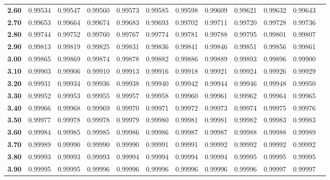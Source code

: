 \documentclass[a4paper]{article}
\begin{document}
\begin{tabular}{l|lllllllllll}
\bfseries  2.60&   0.99534&   0.99547&   0.99560&   0.99573&   0.99585&   0.99598&   0.99609&   0.99621&   0.99632&   0.99643&\\ 
\bfseries  2.70&   0.99653&   0.99664&   0.99674&   0.99683&   0.99693&   0.99702&   0.99711&   0.99720&   0.99728&   0.99736&\\
\bfseries  2.80&   0.99744&   0.99752&   0.99760&   0.99767&   0.99774&   0.99781&   0.99788&   0.99795&   0.99801&   0.99807&\\
\bfseries  2.90&   0.99813&   0.99819&   0.99825&   0.99831&   0.99836&   0.99841&   0.99846&   0.99851&   0.99856&   0.99861&\\ \hline 
\bfseries  3.00&   0.99865&   0.99869&   0.99874&   0.99878&   0.99882&   0.99886&   0.99889&   0.99893&   0.99896&   0.99900&\\
\bfseries  3.10&   0.99903&   0.99906&   0.99910&   0.99913&   0.99916&   0.99918&   0.99921&   0.99924&   0.99926&   0.99929&\\
\bfseries  3.20&   0.99931&   0.99934&   0.99936&   0.99938&   0.99940&   0.99942&   0.99944&   0.99946&   0.99948&   0.99950&\\ 
\bfseries  3.30&   0.99952&   0.99953&   0.99955&   0.99957&   0.99958&   0.99960&   0.99961&   0.99962&   0.99964&   0.99965&\\
\bfseries  3.40&   0.99966&   0.99968&   0.99969&   0.99970&   0.99971&   0.99972&   0.99973&   0.99974&   0.99975&   0.99976&\\ \hline
\bfseries  3.50&   0.99977&   0.99978&   0.99978&   0.99979&   0.99980&   0.99981&   0.99981&   0.99982&   0.99983&   0.99983&\\ 
\bfseries  3.60&   0.99984&   0.99985&   0.99985&   0.99986&   0.99986&   0.99987&   0.99987&   0.99988&   0.99988&   0.99989&\\
\bfseries  3.70&   0.99989&   0.99990&   0.99990&   0.99990&   0.99991&   0.99991&   0.99992&   0.99992&   0.99992&   0.99992&\\ 
\bfseries  3.80&   0.99993&   0.99993&   0.99993&   0.99994&   0.99994&   0.99994&   0.99994&   0.99995&   0.99995&   0.99995&\\
\bfseries  3.90&   0.99995&   0.99995&   0.99996&   0.99996&   0.99996&   0.99996&   0.99996&   0.99996&   0.99997&   0.99997&\\ \hline
\end{tabular}
\end{document}
